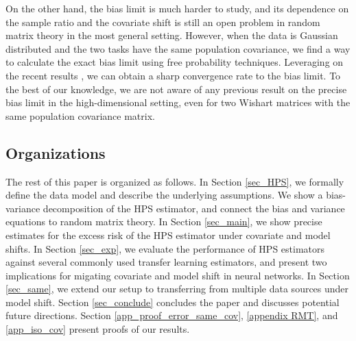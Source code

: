 On the other hand, the bias limit is much harder to study, and its dependence on the sample ratio and the covariate shift is still an open problem in random matrix theory in the most general setting. However, when the data is Gaussian distributed and the two tasks have the same population covariance, we find a way to calculate the exact bias limit using free probability techniques. Leveraging on the recent results \cite{BES_free1,BES_free2}, we can obtain a sharp convergence rate to the bias limit. To the best of our knowledge, we are not aware of any previous result on the precise bias limit in the high-dimensional setting, even for two Wishart matrices with the same population covariance matrix. 





\subsection{Organizations}
The rest of this paper is organized as follows.
In Section \ref{sec_HPS}, we formally define the data model and describe the underlying assumptions.
We show a bias-variance decomposition of the HPS estimator, and connect the bias and variance equations to random matrix theory.
In Section \ref{sec_main}, we show precise estimates for the excess risk of the HPS estimator under covariate and model shifts.
In Section \ref{sec_exp}, we evaluate the performance of HPS estimators against several commonly used transfer learning estimators, and present two implications for migating covariate and model shift in neural networks.
In Section \ref{sec_same}, we extend our setup to transferring from multiple data sources under model shift.
Section \ref{sec_conclude} concludes the paper and discusses potential future directions.
Section \ref{app_proof_error_same_cov}, \ref{appendix RMT}, and \ref{app_iso_cov} present proofs of our results.